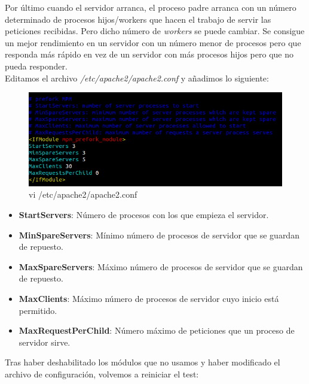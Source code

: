 \newpage
Por último cuando el servidor arranca, el proceso padre arranca con un número determinado de procesos hijos/workers que hacen el trabajo de servir las peticiones recibidas. Pero dicho número de \textit{workers} se puede cambiar. Se consigue un mejor rendimiento en un servidor con un número menor de procesos pero que responda más rápido en vez de un servidor con más procesos hijos pero que no pueda responder. \\

Editamos el archivo \textit{/etc/apache2/apache2.conf} y añadimos lo siguiente:

\begin{figure}[h]
	\centering
	\includegraphics[scale=0.55]{images/yea.png}
	\caption{vi /etc/apache2/apache2.conf}
\end{figure} 

\begin{itemize}
	\item \textbf{StartServers}: Número de procesos con los que empieza el servidor.
	\item \textbf{MinSpareServers}: Mínimo número de procesos de servidor que se guardan de repuesto.
	\item \textbf{MaxSpareServers}: Máximo número de procesos de servidor que se guardan de repuesto.
	\item \textbf{MaxClients}: Máximo número de procesos de servidor cuyo inicio está permitido.
	\item \textbf{MaxRequestPerChild}: Número máximo de peticiones que un proceso de servidor sirve.
\end{itemize}


\newpage
Tras haber deshabilitado los módulos que no usamos y haber modificado el archivo de configuración, volvemos a reiniciar el test:

